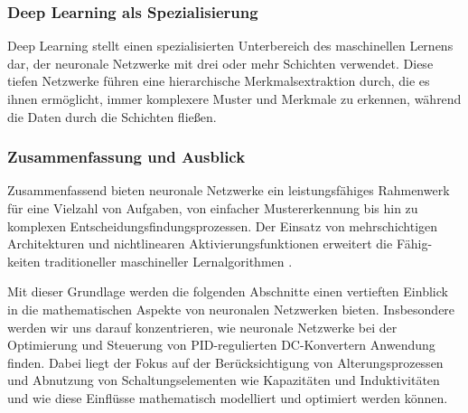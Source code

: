 \subsubsection{Deep Learning als Spezialisierung}
Deep Learning stellt einen spezialisierten Unterbereich des maschinellen Lernens dar, der neuronale Netzwerke mit drei oder mehr Schichten verwendet. Diese tiefen Netzwerke führen eine hierarchische Merkmalsextraktion durch, die es ihnen ermöglicht, immer komplexere Muster und Merkmale zu erkennen, während die Daten durch die Schichten fließen.

\subsubsection{Zusammenfassung und Ausblick}
Zusammenfassend bieten neuronale Netzwerke ein leistungsfähiges Rahmenwerk für eine Vielzahl von Aufgaben, von einfacher Mustererkennung bis hin zu komplexen Entscheidungsfindungsprozessen. Der Einsatz von mehrschichtigen Architekturen und nichtlinearen Aktivierungsfunktionen erweitert die Fähig-keiten traditioneller maschineller Lernalgorithmen \cite{aggarwal_neural_networks_2018}.

Mit dieser Grundlage werden die folgenden Abschnitte einen vertieften Einblick in die mathematischen Aspekte von neuronalen Netzwerken bieten. Insbesondere werden wir uns darauf konzentrieren, wie neuronale Netzwerke bei der Optimierung und Steuerung von PID-regulierten DC-Konvertern Anwendung finden. Dabei liegt der Fokus auf der Berücksichtigung von Alterungsprozessen und Abnutzung von Schaltungselementen wie Kapazitäten und Induktivitäten und wie diese Einflüsse mathematisch modelliert und optimiert werden können.
